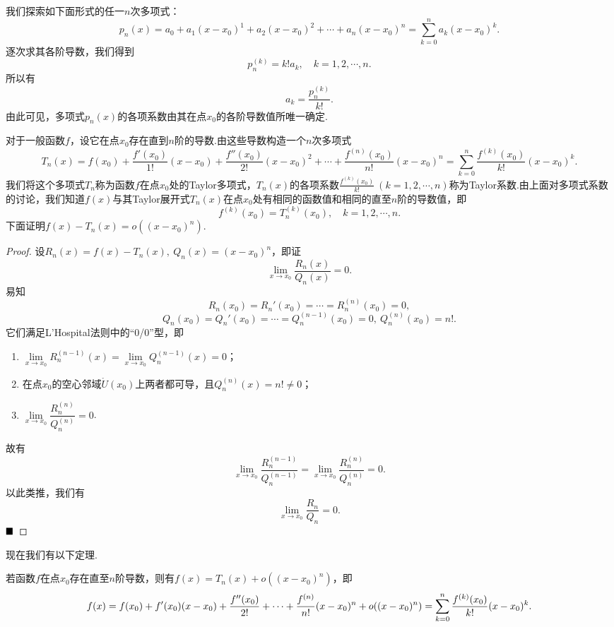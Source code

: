 我们探索如下面形式的任一$n$次多项式：
$$p_n(x)=a_0+a_1(x-x_0)^1+a_2(x-x_0)^2+\cdots+a_n(x-x_0)^n=\sum_{k=0}^{n}a_k(x-x_0)^k.$$
逐次求其各阶导数，我们得到
$$p_n^{(k)}=k!a_k,\quad k=1,2,\cdots,n.$$
所以有
$$a_k=\frac{p_n^{(k)}}{k!}.$$
由此可见，多项式$p_n(x)$的各项系数由其在点$x_0$的各阶导数值所唯一确定.

对于一般函数$f$，设它在点$x_0$存在直到$n$阶的导数.由这些导数构造一个$n$次多项式
$$T_n(x)=f(x_0)+\frac{f'(x_0)}{1!}(x-x_0)+\frac{f''(x_0)}{2!}(x-x_0)^2+\cdots+\frac{f^{(n)}(x_0)}{n!}(x-x_0)^n=\sum_{k=0}^{n}\frac{f^{(k)}(x_0)}{k!}(x-x_0)^k.$$
我们将这个多项式$T_n$称为函数$f$在点$x_0$处的{\heiti Taylor多项式}，$T_n(x)$的各项系数$\frac{f^{(k)}(x_0)}{k!}\ (k=1,2,\cdots,n)$称为{\heiti Taylor系数}.由上面对多项式系数的讨论，我们知道$f(x)$与其Taylor展开式$T_n(x)$在点$x_0$处有相同的函数值和相同的直至$n$阶的导数值，即
$$f^{(k)}(x_0)=T_n^{(k)}(x_0),\quad k=1,2,\cdots,n.$$
下面证明$f(x)-T_n(x)=o((x-x_0)^n)$.
\begin{proof}
	设$R_n(x)=f(x)-T_n(x),\ Q_n(x)=(x-x_0)^n$，即证
	$$\lim\limits_{x\to x_0}\frac{R_n(x)}{Q_n(x)}=0.$$
	易知
	$$R_n(x_0)=R_n'(x_0)=\cdots=R_n^{(n)}(x_0)=0,$$
	$$Q_n(x_0)=Q_n'(x_0)=\cdots=Q_n^{(n-1)}(x_0)=0,\ Q_n^{(n)}(x_0)=n!.$$
	它们满足L'Hospital法则中的“0/0”型，即
	\begin{enumerate}
		\item $\lim\limits_{x\to x_0}R_n^{(n-1)}(x)=\lim\limits_{x\to x_0}Q_n^{(n-1)}(x)=0$；
		
		\item 在点$x_0$的空心邻域$\mathring{U}(x_0)$上两者都可导，且$Q_n^{(n)}(x)=n!\neq 0$；
		
		\item $\lim\limits_{x\to x_0}\dfrac{R_n^{(n)}}{Q_n^{(n)}}=0$.
		
	\end{enumerate}
	故有
	$$\lim\limits_{x\to x_0}\frac{R_n^{(n-1)}}{Q_n^{(n-1)}}=\lim\limits_{x\to x_0}\frac{R_n^{(n)}}{Q_n^{(n)}}=0.$$
	以此类推，我们有
	$$\lim\limits_{x\to x_0}\frac{R_n}{Q_n}=0.$$
	$\hfill\blacksquare$
\end{proof}
现在我们有以下定理.
\begin{theorem}
	若函数$f$在点$x_0$存在直至$n$阶导数，则有$f(x)=T_n(x)+o((x-x_0)^n)$，即
	\begin{equation}{\label{peanotaylor}}
		f(x)=f(x_0)+f'(x_0)(x-x_0)+\frac{f''(x_0)}{2!}+\cdots+\frac{f^{(n)}}{n!}(x-x_0)^n+o((x-x_0)^n)=\sum_{k=0}^{n}\frac{f^{(k)}(x_0)}{k!}(x-x_0)^k.
	\end{equation}
\end{theorem}
